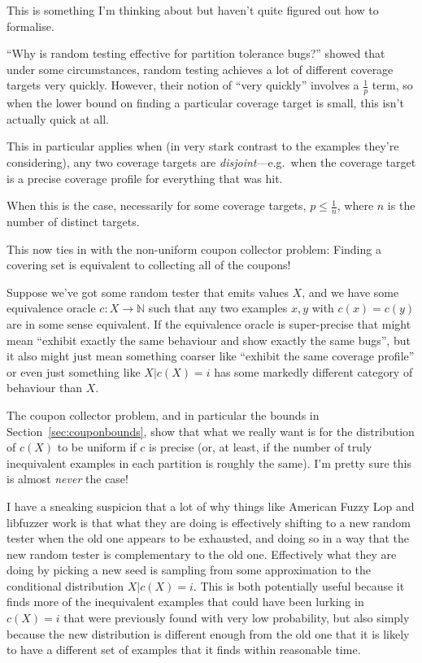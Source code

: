 \documentclass[a4paper]{book}
\begin{document}
This is something I'm thinking about but haven't quite figured out how to formalise.

``Why is random testing effective for partition tolerance bugs?''\cite{DBLP:journals/pacmpl/MajumdarN18} showed that under some circumstances,
random testing achieves a lot of different coverage targets very quickly.
However, their notion of ``very quickly'' involves a \(\frac{1}{p}\) term,
so when the lower bound on finding a particular coverage target is small,
this isn't actually quick at all.

This in particular applies when (in very stark contrast to the examples they're considering),
any two coverage targets are \emph{disjoint}---e.g.\ 
when the coverage target is a precise coverage profile for everything that was hit.

When this is the case,
necessarily for some coverage targets, \(p \leq \frac{1}{n}\),
where \(n\) is the number of distinct targets.

This now ties in with the non-uniform coupon collector problem:
Finding a covering set is equivalent to collecting all of the coupons!

Suppose we've got some random tester that emits values \(X\),
and we have some equivalence oracle \(c: X \to \mathbb{N}\) such that any two examples \(x, y\) with \(c(x) = c(y)\) are in some sense equivalent.
If the equivalence oracle is super-precise that might mean ``exhibit exactly the same behaviour and show exactly the same bugs'',
but it also might just mean something coarser like ``exhibit the same coverage profile'' or even just something like \(X|c(X) = i\) has some markedly different category of behaviour than \(X\).

The coupon collector problem, and in particular the bounds in Section~\ref{sec:couponbounds},
show that what we really want is for the distribution of \(c(X)\) to be uniform if \(c\) is precise (or, at least, if the number of truly inequivalent examples in each partition is roughly the same).
I'm pretty sure this is almost \emph{never} the case!

I have a sneaking suspicion that a lot of why things like American Fuzzy Lop and libfuzzer work is that what they are doing is effectively shifting to a new random tester when the old one appears to be exhausted,
and doing so in a way that the new random tester is complementary to the old one.
Effectively what they are doing by picking a new seed is sampling from some approximation to the conditional distribution \(X|c(X) = i\).
This is both potentially useful because it finds more of the inequivalent examples that could have been lurking in \(c(X) = i\) that were previously found with very low probability,
but also simply because the new distribution is different enough from the old one that it is likely to have a different set of examples that it finds within reasonable time.
\end{document}
